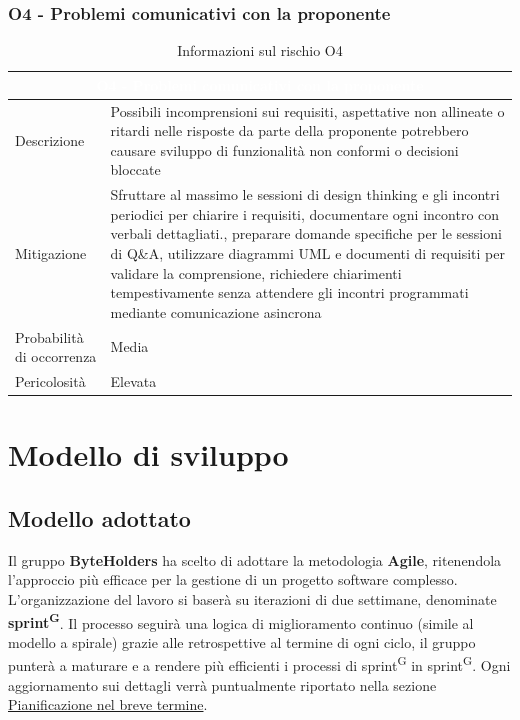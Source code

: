 \documentclass[a4paper, 11pt]{article}
\begin{document}
\subsubsection{O4 - Problemi comunicativi con la proponente}
\begin{table}[H]
  \centering
    \begin{tabular}{|p{}|p{}|}
        \hline
        \multicolumn{2}{|c|}{\cellcolor{AccentColor}\textcolor{white}{\textbf{O4 - Problemi comunicativi con la proponente}}} \\ 
        \hline
        Descrizione & Possibili incomprensioni sui requisiti, aspettative non allineate o ritardi nelle risposte da parte della proponente potrebbero causare sviluppo di funzionalità non conformi o decisioni bloccate \\ 
        \hline
        Mitigazione & Sfruttare al massimo le sessioni di design thinking e gli incontri periodici per chiarire i requisiti, documentare ogni incontro con verbali dettagliati., preparare domande specifiche per le sessioni di Q\&A, utilizzare diagrammi UML e documenti di requisiti per validare la comprensione, richiedere chiarimenti tempestivamente senza attendere gli incontri programmati mediante comunicazione asincrona \\ 
        \hline
        Probabilità di occorrenza & Media \\
        \hline
        Pericolosità & Elevata \\
        \hline
    \end{tabular}
  \caption{Informazioni sul rischio O4}
\end{table}



\newpage


\section{Modello di sviluppo}

\subsection{Modello adottato}
Il gruppo \textbf{ByteHolders} ha scelto di adottare la metodologia \textbf{Agile}, ritenendola l'approccio più efficace per la gestione di un progetto software complesso. L'organizzazione del lavoro si baserà su iterazioni di due settimane, denominate \textbf{sprint\textsuperscript{G}}.
Il processo seguirà una logica di miglioramento continuo (simile al modello a spirale) grazie alle retrospettive al termine di ogni ciclo, il gruppo punterà a maturare e a rendere più efficienti i processi di sprint\textsuperscript{G} in sprint\textsuperscript{G}. Ogni aggiornamento sui dettagli verrà puntualmente riportato nella sezione \hyperref[pianificazione_breve_termine]{Pianificazione nel breve termine}.
\end{document}
